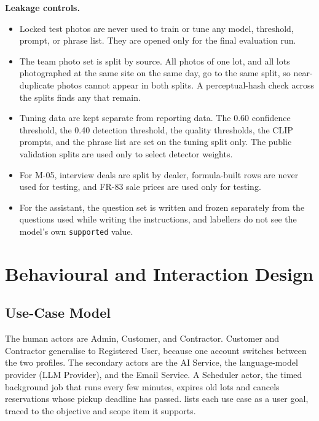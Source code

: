 \textbf{Leakage controls.}\label{sec:leakage-controls}
\begin{itemize}
  \item Locked test photos are never used to train or tune any model, threshold,
        prompt, or phrase list. They are opened only for the final evaluation run.
  \item The team photo set is split by source. All photos of one lot, and all lots
        photographed at the same site on the same day, go to the same split, so
        near-duplicate photos cannot appear in both splits. A perceptual-hash check
        across the splits finds any that remain.
  \item Tuning data are kept separate from reporting data. The 0.60 confidence
        threshold, the 0.40 detection threshold, the quality thresholds, the CLIP
        prompts, and the phrase list are set on the tuning split only. The public
        validation splits are used only to select detector weights.
  \item For M-05, interview deals are split by dealer, formula-built rows are never
        used for testing, and FR-83 sale prices are used only for testing.
  \item For the assistant, the question set is written and frozen separately from the
        questions used while writing the instructions, and labellers do not see the
        model's own \texttt{supported} value.
\end{itemize}



\section{Behavioural and Interaction Design }

\subsection{Use-Case Model}
The human actors are Admin, Customer, and Contractor. Customer and Contractor
generalise to Registered User, because one account switches between the two
profiles. The secondary actors are the AI Service, the language-model provider (LLM
Provider), and the Email Service. A Scheduler actor, the timed background job that runs
every few minutes, expires old lots and cancels reservations whose pickup deadline has passed.
 lists each use case as a user goal, traced to the
objective and scope item it supports.

